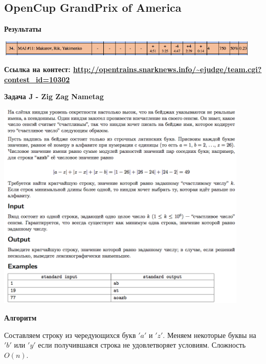 \documentclass[a4paper,12pt]{article}
\begin{document}
%
%
\newpage
\subsection{OpenCup GrandPrix of America}

\textbf{{\large Результаты}} \\
\begin{center}
\includegraphics[width=0.95\textwidth]{OC_America/OC_America_result.png}\\ [1cm]
\end{center}

\textbf{{\large Ссылка на контест: \url{http://opentrains.snarknews.info/~ejudge/team.cgi?contest_id=10302}}}

\newpage
\textbf{{\large Задача J - Zig Zag Nametag}}

\begin{center}
\includegraphics[width=0.9\textwidth]{OC_America/OC_America_J.png}\\ [1cm]
\end{center}

\newpage
\textbf{{\large Алгоритм}}

Составляем строку из чередующихся букв $'a'$ и $'z'$. Меняем некоторые буквы на $'b'$ или $'y'$ если получившаяся строка не удовлетворяет условиям. Сложность $O(n)$. \\
\end{document}
